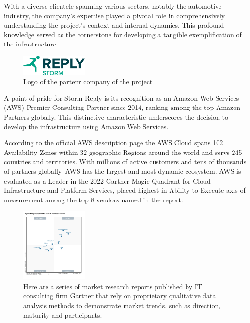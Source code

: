 With a diverse clientele spanning various sectors, notably the automotive industry, the company's expertise played a pivotal role in comprehensively understanding the project's context and internal dynamics. This profound knowledge served as the cornerstone for developing a tangible exemplification of the infrastructure.

\begin{figure}[h]  %
  \centering
  \includegraphics[width=0.3\textwidth]{images/Storm_Reply_logo.png}  %
  \caption{Logo of the partenr company of the project}
  \label{fig:StormReplyLogo}
\end{figure}

A point of pride for Storm Reply is its recognition as an Amazon Web Services (AWS) Premier Consulting Partner since 2014, ranking among the top Amazon Partners globally. This distinctive characteristic underscores the decision to develop the infrastructure using Amazon Web Services.

According to the official AWS description page \cite{AWSGlobalInfrastructure} the AWS Cloud spans 102 Availability Zones within 32 geographic Regions around the world and servs 245 countries and territories. With millions of active customers and tens of thousands of partners globally, AWS has the largest and most dynamic ecosystem. AWS is evaluated as a Leader in the 2022 Gartner Magic Quadrant for Cloud Infrastructure and Platform Services, placed highest in Ability to Execute axis of measurement among the top 8 vendors named in the report.

\begin{figure}[h]  %
  \centering
  \includegraphics[width=0.3\textwidth]{images/AWSMagicQuadrantForCloud.png}  %
  \caption{Here are a series of market research reports published by IT consulting firm Gartner that rely on proprietary qualitative data analysis methods to demonstrate market trends, such as direction, maturity and participants. \cite{GartnerMagicQuadrant}}
  \label{fig:AWSMagicQuadrantForCloud}
\end{figure}

